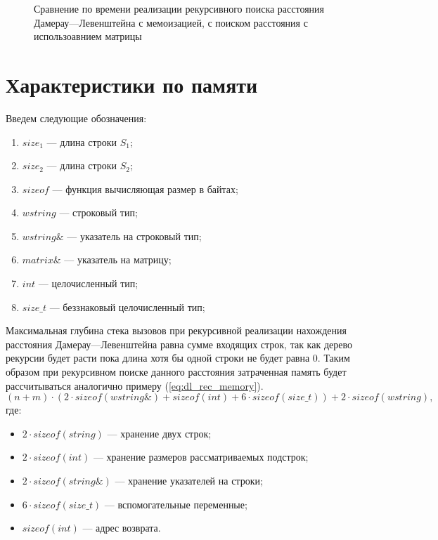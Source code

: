 \begin{figure}[H]
	\centering
	
	\caption{Сравнение по времени реализации рекурсивного поиска расстояния Дамерау---Левенштейна с  мемоизацией, с поиском
	расстояния с использоавнием матрицы}
	\label{plt:time_mat_rec_cmp}
\end{figure}


\section{Характеристики по памяти}

Введем следующие обозначения:
\begin{enumerate}
	\item $size_{1}$ --- длина строки $S_{1}$;
	\item $size_{2}$ --- длина строки $S_{2}$;
	\item $sizeof$ --- функция вычисляющая размер в байтах;
	\item $wstring$ --- строковый тип;
	\item $wstring\&$ --- указатель на строковый тип;
	\item $matrix\&$ --- указатель на матрицу;
	\item $int$ --- целочисленный тип;
	\item $size\_t$ --- беззнаковый целочисленный тип;
\end{enumerate}

Максимальная глубина стека вызовов при рекурсивной реализации нахождения расстояния Дамерау---Левенштейна равна сумме входящих строк,
так как дерево рекурсии будет расти пока длина хотя бы одной строки не будет равна 0. Таким образом при рекурсивном поиске данного расстояния затраченная память
будет рассчитываться  аналогично примеру (\ref{eq:dl_rec_memory}).
\begin{equation}
	\label{eq:dl_rec_memory}
	(n + m) \cdot (2 \cdot sizeof(wstring\&) + sizeof(int) + 6 \cdot sizeof(size\_t)) + 2 \cdot sizeof(wstring),
\end{equation}
где:
\begin{itemize}
	\item $2 \cdot sizeof(string)$ --- хранение двух строк;
	\item $2 \cdot sizeof(int)$ --- хранение размеров рассматриваемых подстрок;
	\item $2 \cdot sizeof(string\&)$ --- хранение указателей на строки;
	\item $6 \cdot sizeof(size\_t)$ --- вспомогательные переменные;
	\item $sizeof(int)$ --- адрес возврата.
\end{itemize}

